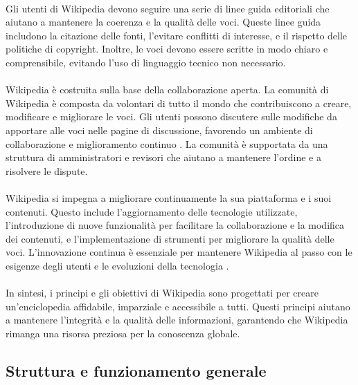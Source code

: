 \documentclass[12pt,a4paper]{report}
\begin{document}
\paragraph*{}
Gli utenti di Wikipedia devono seguire una serie di linee guida editoriali che aiutano a mantenere la coerenza e la qualità delle voci. Queste linee guida includono la citazione delle fonti, l'evitare conflitti di interesse, e il rispetto delle politiche di copyright. Inoltre, le voci devono essere scritte in modo chiaro e comprensibile, evitando l'uso di linguaggio tecnico non necessario.
\paragraph*{}
Wikipedia è costruita sulla base della collaborazione aperta. La comunità di Wikipedia è composta da volontari di tutto il mondo che contribuiscono a creare, modificare e migliorare le voci. Gli utenti possono discutere sulle modifiche da apportare alle voci nelle pagine di discussione, favorendo un ambiente di collaborazione e miglioramento continuo \cite{reagle2010good}. La comunità è supportata da una struttura di amministratori e revisori che aiutano a mantenere l'ordine e a risolvere le dispute.
\paragraph*{}
Wikipedia si impegna a migliorare continuamente la sua piattaforma e i suoi contenuti. Questo include l'aggiornamento delle tecnologie utilizzate, l'introduzione di nuove funzionalità per facilitare la collaborazione e la modifica dei contenuti, e l'implementazione di strumenti per migliorare la qualità delle voci. L'innovazione continua è essenziale per mantenere Wikipedia al passo con le esigenze degli utenti e le evoluzioni della tecnologia \cite{history_of_wikis}.
\paragraph*{}
In sintesi, i principi e gli obiettivi di Wikipedia sono progettati per creare un'enciclopedia affidabile, imparziale e accessibile a tutti. Questi principi aiutano a mantenere l'integrità e la qualità delle informazioni, garantendo che Wikipedia rimanga una risorsa preziosa per la conoscenza globale.

\subsection{Struttura e funzionamento generale}
\end{document}
